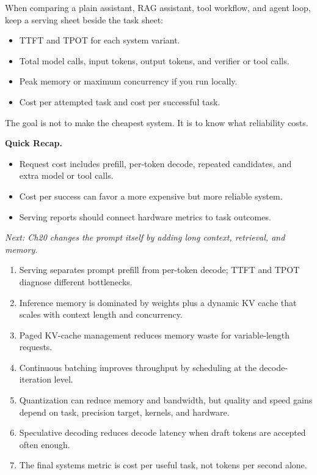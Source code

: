 \begin{tcolorbox}[colback=orange!5, colframe=orange!60, title=\textbf{For Project~4: Benchmark the System, Not the Call}]
When comparing a plain assistant, RAG assistant, tool workflow, and agent loop, keep a serving sheet beside the task sheet:
\begin{itemize}[nosep,leftmargin=1.4em]
  \item TTFT and TPOT for each system variant.
  \item Total model calls, input tokens, output tokens, and verifier or tool calls.
  \item Peak memory or maximum concurrency if you run locally.
  \item Cost per attempted task and cost per successful task.
\end{itemize}
The goal is not to make the cheapest system. It is to know what reliability costs.
\end{tcolorbox}

\begin{quickrecap}
\textbf{Quick Recap.}
\begin{itemize}[nosep,leftmargin=1.5em]
  \item Request cost includes prefill, per-token decode, repeated candidates, and extra model or tool calls.
  \item Cost per success can favor a more expensive but more reliable system.
  \item Serving reports should connect hardware metrics to task outcomes.
\end{itemize}
\textit{Next: Ch20 changes the prompt itself by adding long context, retrieval, and memory.}
\end{quickrecap}



\begin{takeaways}
\begin{enumerate}
  \item Serving separates prompt prefill from per-token decode; TTFT and TPOT diagnose different bottlenecks.
  \item Inference memory is dominated by weights plus a dynamic KV cache that scales with context length and concurrency.
  \item Paged KV-cache management reduces memory waste for variable-length requests.
  \item Continuous batching improves throughput by scheduling at the decode-iteration level.
  \item Quantization can reduce memory and bandwidth, but quality and speed gains depend on task, precision target, kernels, and hardware.
  \item Speculative decoding reduces decode latency when draft tokens are accepted often enough.
  \item The final systems metric is cost per useful task, not tokens per second alone.
\end{enumerate}
\end{takeaways}


